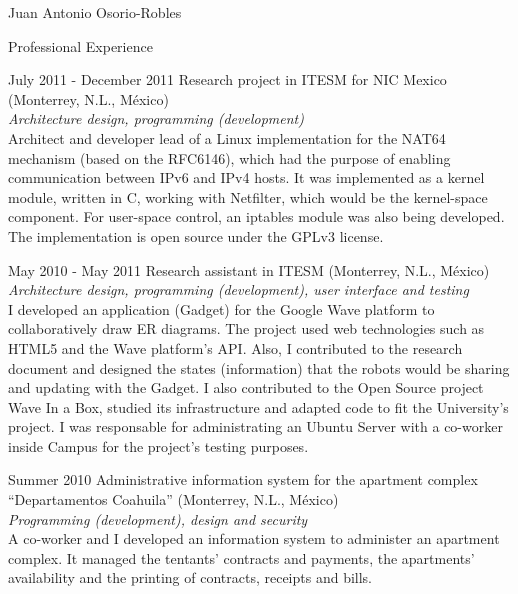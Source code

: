 \documentclass[spanish,10pt,letterpaper]{article}
\begin{document}
\begin{cv}{Juan Antonio Osorio-Robles}
	\begin{cvlist}{Professional Experience}
		\item [July 2011 - December 2011]
			Research project in ITESM for NIC Mexico (Monterrey, N.L., M\'{e}xico)
			\\ \emph{Architecture design, programming (development)}
			\\ Architect and developer lead of a Linux implementation for the NAT64 mechanism (based on the RFC6146), which had the purpose of enabling communication between IPv6 and IPv4 hosts. It was implemented as a kernel module, written in C, working with Netfilter, which would be the kernel-space component. For user-space control, an iptables module was also being developed. The implementation is open source under the GPLv3 license.
		\item [May 2010 - May 2011]
			Research assistant in ITESM (Monterrey, N.L., M\'{e}xico)
			\\ \emph{Architecture design, programming (development), user interface and testing}
			\\ I developed an application (Gadget) for the Google Wave platform to collaboratively draw ER diagrams. The project used web technologies such as HTML5 and the Wave platform's API. Also, I contributed to the research document and designed the states (information) that the robots would be sharing and updating with the Gadget. I also contributed to the Open Source project Wave In a Box, studied its infrastructure and adapted code to fit the University's project. I was responsable for administrating an Ubuntu Server with a co-worker inside Campus for the project's testing purposes.
		\item [Summer 2010]
			Administrative information system for the apartment complex ``Departamentos Coahuila'' (Monterrey, N.L., M\'{e}xico)
			\\ \emph{Programming (development), design and security}
			\\ A co-worker and I developed an information system to administer an apartment complex. It managed the tentants' contracts and payments, the apartments' availability and the printing of contracts, receipts and bills.
			
	\end{cvlist}


\end{cv}
\end{document}
